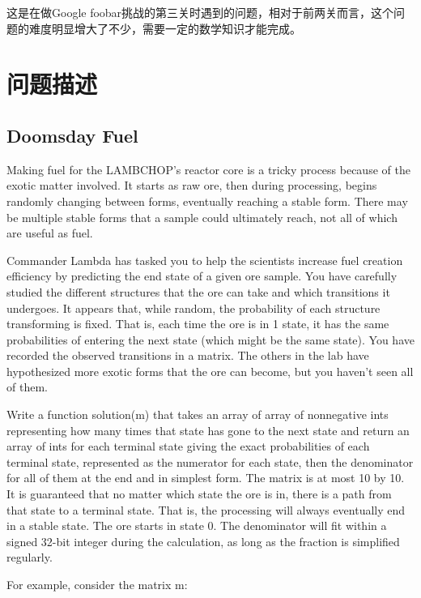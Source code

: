 \documentclass[12pt]{article}
\begin{document}
\makeblogtitle

这是在做Google foobar挑战的第三关时遇到的问题，相对于前两关而言，这个问题的难度明显增大了不少，需要一定的数学知识才能完成。

\section{问题描述}\label{ux95eeux9898ux63cfux8ff0}

\subsection{Doomsday Fuel}\label{doomsday-fuel}

Making fuel for the LAMBCHOP's reactor core is a tricky process because of the exotic matter involved. It starts as raw ore, then during processing, begins randomly changing between forms, eventually reaching a stable form. There may be multiple stable forms that a sample could ultimately reach, not all of which are useful as fuel.

Commander Lambda has tasked you to help the scientists increase fuel creation efficiency by predicting the end state of a given ore sample. You have carefully studied the different structures that the ore can take and which transitions it undergoes. It appears that, while random, the probability of each structure transforming is fixed. That is, each time the ore is in 1 state, it has the same probabilities of entering the next state (which might be the same state). You have recorded the observed transitions in a matrix. The others in the lab have hypothesized more exotic forms that the ore can become, but you haven't seen all of them.

Write a function solution(m) that takes an array of array of nonnegative ints representing how many times that state has gone to the next state and return an array of ints for each terminal state giving the exact probabilities of each terminal state, represented as the numerator for each state, then the denominator for all of them at the end and in simplest form. The matrix is at most 10 by 10. It is guaranteed that no matter which state the ore is in, there is a path from that state to a terminal state. That is, the processing will always eventually end in a stable state. The ore starts in state 0. The denominator will fit within a signed 32-bit integer during the calculation, as long as the fraction is simplified regularly.

For example, consider the matrix m:
\end{document}
